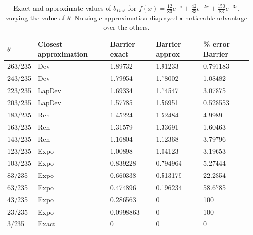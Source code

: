 \begin{table}[!h]
\begin{tabular}{|l|l|l|l|l|}
\hline
$\theta$ & Closest approximation & Barrier exact & Barrier approx & \% error Barrier \\ \hline
263/235 & Dev    & 1.89732   & 1.91233  & 0.791183 \\ \hline
243/235 & Dev    & 1.79954   & 1.78002  & 1.08482  \\ \hline
223/235 & LapDev & 1.69334   & 1.74547  & 3.07875  \\ \hline
203/235 & LapDev & 1.57785   & 1.56951  & 0.528553 \\ \hline
183/235 & Ren    & 1.45224   & 1.52484  & 4.9989   \\ \hline
163/235 & Ren    & 1.31579   & 1.33691  & 1.60463  \\ \hline
143/235 & Ren    & 1.16804   & 1.12368  & 3.79796  \\ \hline
123/235 & Expo   & 1.00898   & 1.04123  & 3.19653  \\ \hline
103/235 & Expo   & 0.839228  & 0.794964 & 5.27444  \\ \hline
83/235  & Expo   & 0.660338  & 0.513179 & 22.2854  \\ \hline
63/235  & Expo   & 0.474896  & 0.196234 & 58.6785  \\ \hline
43/235  & Expo   & 0.286563  & 0        & 100      \\ \hline
23/235  & Expo   & 0.0998863 & 0        & 100      \\ \hline
3/235   & Exact  & 0         & 0        & 0        \\ \hline
\end{tabular}
\caption{Exact and approximate values of $b_{DeF}$ for $f(x)=\frac{12}{83 }e^{-x}+\frac{42}{83} e^{-2 x}+\frac{150}{83}e^{-3x}$, varying the value of $\theta$. No single approximation displayed a noticeable advantage over the others.}
\label{table:MixExp83Bar}
\end{table} 